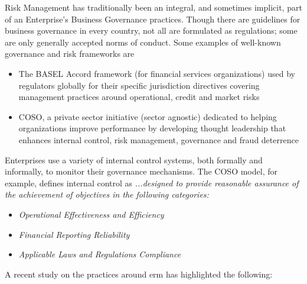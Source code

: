 %
%

Risk Management has traditionally been an integral, and sometimes implicit, part of an Enterprise’s
Business Governance practices.
Though there are guidelines for business governance in every country, not all are formulated as regulations;
some are only generally accepted norms of conduct\autocite{integration_of_risk_management}.
Some examples of well-known governance and risk frameworks are

\begin{itemize}
    \item The BASEL Accord framework (for financial services organizations) used by regulators globally for their
          specific jurisdiction directives covering management practices around operational, credit and market risks
    \item COSO, a private sector initiative (sector agnostic) dedicated to helping organizations improve
          performance by developing thought leadership that enhances internal control, risk management,
          governance and fraud deterrence
\end{itemize}

Enterprises use a variety of internal control systems, both formally and informally,
to monitor their governance mechanisms.
The COSO model\autocite{erm_integrating_with_strategy_and_performance},
for example, defines internal control as
\textit{...designed to provide reasonable assurance of the achievement of objectives in the following categories:}

\begin{itemize}
    \item \textit{Operational Effectiveness and Efficiency}
    \item \textit{Financial Reporting Reliability}
    \item \textit{Applicable Laws and Regulations Compliance}
\end{itemize}

A recent study\autocite{erm_integrating_with_strategy_and_performance}
on the practices around \gls{erm} has highlighted the following:

